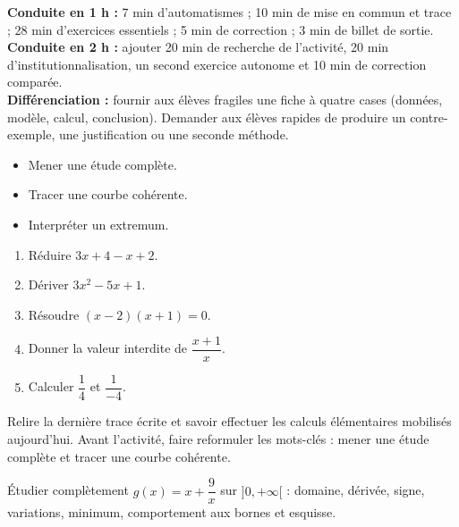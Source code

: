 \ifprof
\begin{methode}
\textbf{Conduite en 1 h :} 7 min d'automatismes ; 10 min de mise en commun et trace ; 28 min d'exercices essentiels ; 5 min de correction ; 3 min de billet de sortie.\\
\textbf{Conduite en 2 h :} ajouter 20 min de recherche de l'activité, 20 min d'institutionnalisation, un second exercice autonome et 10 min de correction comparée.\\
\textbf{Différenciation :} fournir aux élèves fragiles une fiche à quatre cases (données, modèle, calcul, conclusion). Demander aux élèves rapides de produire un contre-exemple, une justification ou une seconde méthode.
\end{methode}
\fi
{}
\begin{objectifs}\begin{itemize}\item Mener une étude complète.\item Tracer une courbe cohérente.\item Interpréter un extremum.\end{itemize}\end{objectifs}
\begin{automatismes}\begin{enumerate}\item Réduire $3x+4-x+2$. \item Dériver $3x^2-5x+1$. \item Résoudre $(x-2)(x+1)=0$. \item Donner la valeur interdite de $\dfrac{x+1}{x}$. \item Calculer $\dfrac1{4}$ et $\dfrac1{-4}$. \end{enumerate}\end{automatismes}
\begin{prerequis}Relire la dernière trace écrite et savoir effectuer les calculs élémentaires mobilisés aujourd'hui. Avant l'activité, faire reformuler les mots-clés : mener une étude complète et tracer une courbe cohérente.\end{prerequis}

\begin{activite}
Étudier complètement $g(x)=x+\dfrac9x$ sur $]0,+\infty[$ : domaine, dérivée, signe, variations, minimum, comportement aux bornes et esquisse.
\begin{center}\end{center}
\end{activite}

